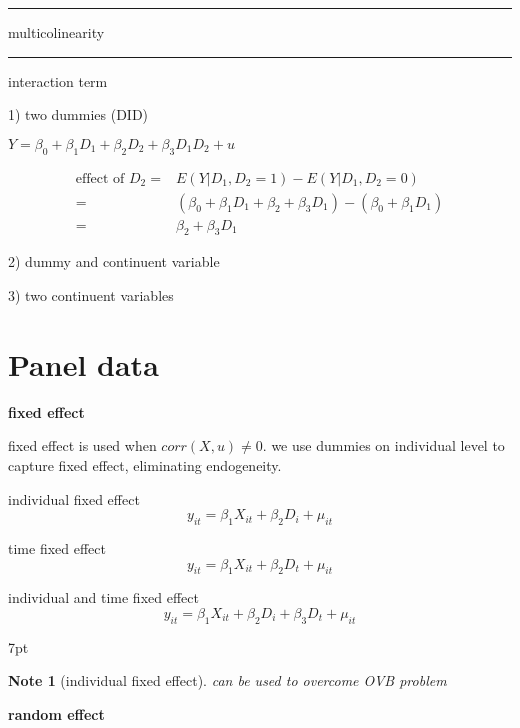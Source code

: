 \documentclass{article}
\newcommand*\sepline{%
  \begin{center}
    \rule[1ex]{.5\textwidth}{.5pt}
  \end{center}}
\newenvironment{blueblock}{
\def\FrameCommand{
  \hspace{1pt}
    {\color{DarkBlue}
    \vrule width 2pt}
    {\color{blueshade}
    \vrule width 4pt}
  \colorbox{blueshade}
}
\MakeFramed{
  \advance
  \hsize-
  \width
  \FrameRestore}
\noindent\hspace{-4.55pt}%
\begin{adjustwidth}{}{7pt}
\vspace{2pt}\vspace{2pt}
}
{\vspace{2pt}\end{adjustwidth}\endMakeFramed}
\newtheorem{note}{Note}
\begin{document}
\sepline

multicolinearity

\sepline

interaction term

1) two dummies (DID)

$Y=\beta_0+\beta_{1}D_1+\beta_{2}D_2+\beta_{3}D_1 D_2+u$

\begin{equation}
  \begin{split}
  \text{effect of $D_2$}=&E(Y|D_1,D_2=1)-E(Y|D_1,D_2=0)\\
  =&(\beta_0+\beta_{1}D_1+\beta_{2}+\beta_{3}D_1)-(\beta_0+\beta_{1}D_1)
  \\=&\beta_2+\beta_3 D_1
  \end{split}
\end{equation}

2) dummy and continuent variable


3) two continuent variables



\section{Panel data}

\textbf{fixed effect}

fixed effect is used when $corr(X,u)\neq 0$. we use dummies on individual level to capture fixed effect, eliminating endogeneity.

individual fixed effect
\begin{equation}
  y_{it}=\beta_1 X_{it}+\beta_2D_i+\mu_{it}
\end{equation}

time fixed effect
\begin{equation}
  y_{it}=\beta_1 X_{it}+\beta_2D_t+\mu_{it}
\end{equation}

individual and time fixed effect
\begin{equation}
  y_{it}=\beta_1 X_{it}+\beta_2D_i+\beta_3D_t+\mu_{it}
\end{equation}


\begin{blueblock}
\begin{note}[individual fixed effect]
can be used to overcome OVB problem
\end{note}
\end{blueblock}



\textbf{random effect}
\end{document}
